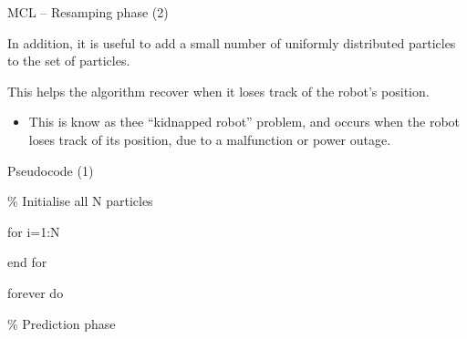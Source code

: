 \documentclass[compress]{beamer}
\begin{document}
\begin{frame}{MCL -- Resamping phase (2)}

In addition, it is useful to add a small number of uniformly distributed
particles to the set of particles.

This helps the algorithm recover when it loses track of the robot's
position.

\begin{itemize}
\item This is know as thee ``kidnapped robot'' problem, and occurs when the
  robot loses track of its position, due to a malfunction or power
  outage.
\end{itemize}

\end{frame}

\begin{frame}{Pseudocode (1)}

\begin{block}{\% Initialise all N particles}

\end{block}

\begin{block}{for i=1:N}

\end{block}

\begin{block}{}

\end{block}

\begin{block}{}

\end{block}

\begin{block}{}

\end{block}

\begin{block}{}

\end{block}

\begin{block}{end for}

\end{block}

\begin{block}{forever do}

\end{block}

\begin{block}{\% Prediction phase}


\end{block}
\end{frame}
\end{document}
